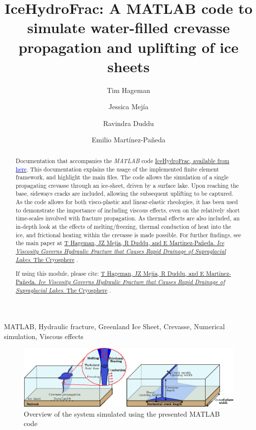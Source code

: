 \documentclass[3p]{elsarticle} %
\newcommand{\citeMe}{\href{https://doi.org/10.5194/tc-18-3991-2024}{T Hageman, JZ Mejia, R Duddu, and E {Martinez-Pa{\~n}eda}. \textit{Ice Viscosity Governs Hydraulic Fracture that Causes Rapid Drainage of Supraglacial Lakes}. The Cryosphere} \citep{Hageman}}
\begin{document}
\begin{frontmatter}
\title{IceHydroFrac: A MATLAB code to simulate water-filled crevasse propagation and uplifting of ice sheets }

\author[1]{Tim Hageman }
\author[2]{Jessica Mejía}
\author[3]{Ravindra Duddu} 
\author[1]{Emilio Martínez-Pañeda}

\address[1]{Department of Engineering Science, University of Oxford, Oxford OX1 3PJ, UK}
\address[2]{Department of Geology, University at Buffalo, Buffalo, NY 14260, USA}
\address[3]{Department of Civil and Environmental Engineering, Department of Earth and Environmental Sciences, Vanderbilt University, Nashville, TN 37235, USA}

\begin{abstract}
Documentation that accompanies the \textit{MATLAB} code \href{https://github.com/T-Hageman/MATLAB_IceHydroFrac}{IceHydroFrac, available from \textcolor{blue}{here}}. This documentation explains the usage of the implemented finite element framework, and highlight the main files.  The code allows the simulation of a single propagating crevasse through an ice-sheet, driven by a surface lake. Upon reaching the base, sideways cracks are included, allowing the subsequent uplifting to be captured. As the code allows for both visco-plastic and linear-elastic rheologies, it has been used to demonstrate the importance of including viscous effects, even on the relatively short time-scales involved with fracture propagation. As thermal effects are also included, an in-depth look at the effects of melting/freezing, thermal conduction of heat into the ice, and frictional heating within the crevasse is made possible. For further findings, see the main paper at \citeMe{}. 

If using this module, please cite: \citeMe{}.
\end{abstract}

\begin{keyword}
MATLAB, Hydraulic fracture, Greenland Ice Sheet, Crevasse, Numerical simulation, Viscous effects
\end{keyword}

\end{frontmatter}

\begin{figure}
	\centering
	\includegraphics[width=16cm]{Figures/CaseOverview.eps}
	\caption{Overview of the system simulated using the presented MATLAB code}
\end{figure}
\end{document}
